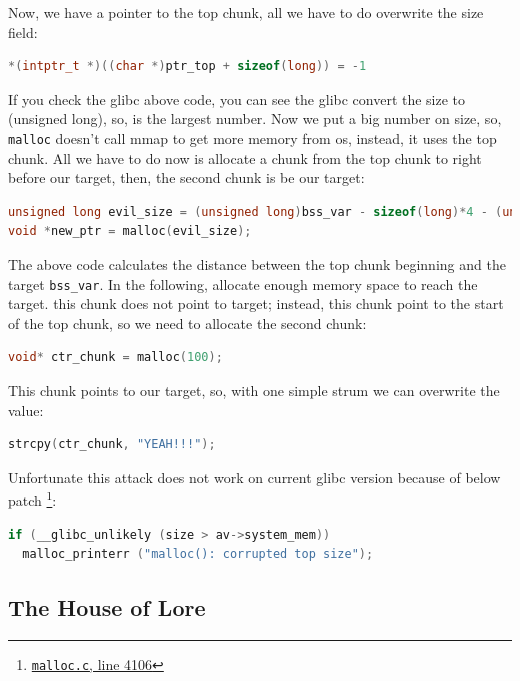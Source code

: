 \documentclass{masterthesis}
\newcommand*\libc{glibc}
\newcommand*\mallocc{\lstinline{malloc}}
\begin{document}
Now, we have a pointer to the top chunk, all we have to do overwrite the size field:

\begin{lstlisting}[language=c,frame=tlrb]
*(intptr_t *)((char *)ptr_top + sizeof(long)) = -1
\end{lstlisting}

If you check the \libc{} above code, you can see the \libc{} convert the size to (unsigned long), so,  is the largest number. Now we put a big number on size, so, \mallocc{} doesn’t call mmap to get more memory from os, instead, it uses the top chunk. All we have to do now is allocate a chunk from the top chunk to right before our target, then, the second chunk is be our target:

\begin{lstlisting}[language=c,frame=tlrb]
unsigned long evil_size = (unsigned long)bss_var - sizeof(long)*4 - (unsigned long)ptr_top;
void *new_ptr = malloc(evil_size);
\end{lstlisting}

The above code calculates the distance between the top chunk beginning and the target \lstinline{bss_var}. In the following, allocate enough memory space to reach the target. this chunk does not point to target; instead, this chunk point to the start of the top chunk, so we need to allocate the second chunk:

\begin{lstlisting}[language=c,frame=tlrb]
void* ctr_chunk = malloc(100);
\end{lstlisting}

This chunk points to our target, so, with one simple strum we can overwrite the value:

\begin{lstlisting}[language=c,frame=tlrb]
strcpy(ctr_chunk, "YEAH!!!");
\end{lstlisting}

Unfortunate this attack does not work on current \libc{} version because of below patch \footnote{\href{https://sourceware.org/git/?p=glibc.git;a=blob;f=malloc/malloc.c;h=f7cd29bc2f93e1082ee77800bd64a4b2a2897055;hb=9ea3686266dca3f004ba874745a4087a89682617\#l4106}{\texttt{malloc.c}, line 4106}}:
\begin{lstlisting}[language=c,frame=tlrb]
if (__glibc_unlikely (size > av->system_mem))
  malloc_printerr ("malloc(): corrupted top size");
\end{lstlisting}

\subsection{The House of Lore}
\end{document}

